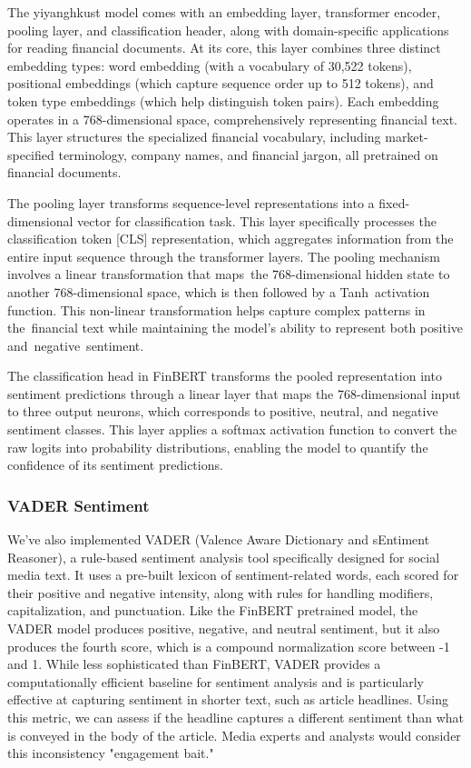 \documentclass[12pt]{article}
\begin{document}
The yiyanghkust model comes with an embedding layer, transformer encoder, pooling layer, and classification header, along with domain-specific applications for reading financial documents. At its core, this layer combines three distinct embedding types: word embedding (with a vocabulary of 30,522 tokens), positional embeddings (which capture sequence order up to 512 tokens), and token type embeddings (which help distinguish token pairs). Each embedding operates in a 768-dimensional space, comprehensively representing financial text. This layer structures the specialized financial vocabulary, including market-specified terminology, company names, and financial jargon, all pretrained on financial documents.

The pooling layer transforms sequence-level representations into a fixed-dimensional vector for classification task. This layer specifically processes the classification token [CLS] representation, which aggregates information from the entire input sequence through the transformer layers. The pooling mechanism involves a linear transformation that maps the 768-dimensional hidden state to another 768-dimensional space, which is then followed by a Tanh activation function. This non-linear transformation helps capture complex patterns in the financial text while maintaining the model's ability to represent both positive and negative sentiment.

The classification head in FinBERT transforms the pooled representation into sentiment predictions through a linear layer that maps the 768-dimensional input to three output neurons, which corresponds to positive, neutral, and negative sentiment classes. This layer applies a softmax activation function to convert the raw logits into probability distributions, enabling the model to quantify the confidence of its sentiment predictions.

\subsubsection*{VADER Sentiment}

We've also implemented VADER (Valence Aware Dictionary and sEntiment Reasoner), a rule-based sentiment analysis tool specifically designed for social media text. It uses a pre-built lexicon of sentiment-related words, each scored for their positive and negative intensity, along with rules for handling modifiers, capitalization, and punctuation. Like the FinBERT pretrained model, the VADER model produces positive, negative, and neutral sentiment, but it also produces the fourth score, which is a compound normalization score between -1 and 1. While less sophisticated than FinBERT, VADER provides a computationally efficient baseline for sentiment analysis and is particularly effective at capturing sentiment in shorter text, such as article headlines. Using this metric, we can assess if the headline captures a different sentiment than what is conveyed in the body of the article. Media experts and analysts would consider this inconsistency "engagement bait."
\end{document}
